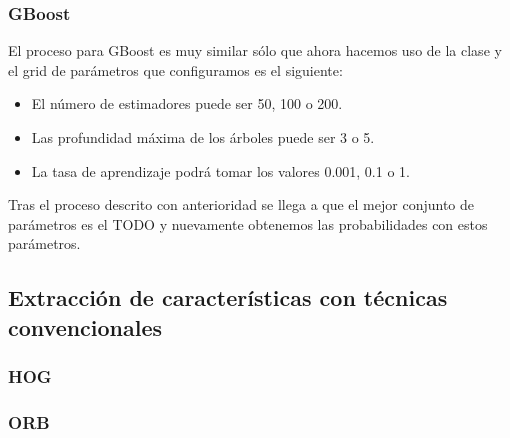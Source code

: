 \subsubsection{GBoost}

El proceso para GBoost es muy similar sólo que ahora hacemos uso de la clase  y el grid de parámetros que configuramos es el siguiente:

\begin{itemize}
\item El número de estimadores puede ser 50, 100 o 200.
\item Las profundidad máxima de los árboles puede ser 3 o 5.
\item La tasa de aprendizaje podrá tomar los valores 0.001, 0.1 o 1.
\end{itemize}

Tras el proceso descrito con anterioridad se llega a que el mejor conjunto de parámetros es el TODO y nuevamente obtenemos las probabilidades con estos parámetros.

\subsection{Extracción de características con técnicas convencionales}

\subsubsection{HOG}

\subsubsection{ORB}
